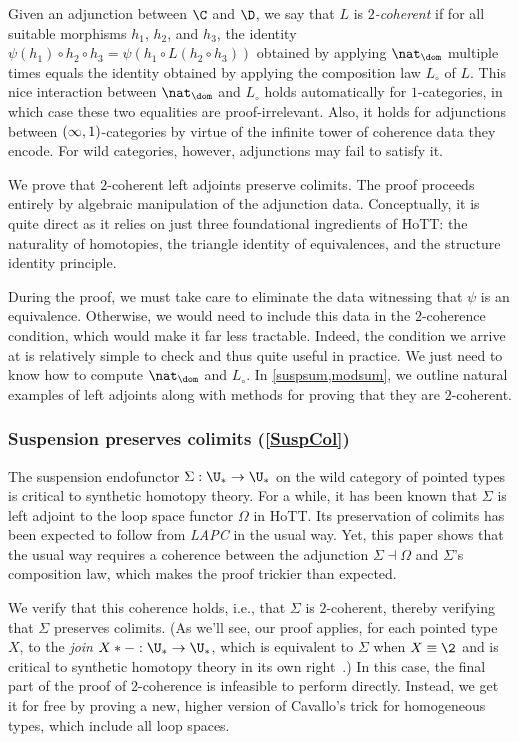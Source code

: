 \documentclass{lmcs}
\theoremstyle{definition}\newtheorem{note}[thm]{Note}
\begin{document}
Given an adjunction between $\C$ and $\D$, we say that $L$ is \emph{$2$-coherent} if for all suitable morphisms $h_1$, $h_2$, and $h_3$, the identity $\psi(h_1) \circ h_2 \circ h_3 = \psi(h_1 \circ L(h_2 \circ h_3))$ obtained by applying $\nat_{\dom}$ multiple times equals the identity obtained by applying the composition law $L_{\circ}$ of $L$. 
This nice interaction between $\nat_{\dom}$ and $L_{\circ}$ holds automatically for $1$-categories, in which case these two equalities are proof-irrelevant. Also, it holds for adjunctions between $\mleft(\infty,1\mright)$-categories by virtue of the infinite tower of coherence data they encode. For wild categories, however, adjunctions may fail to satisfy it.

We prove that $2$-coherent left adjoints preserve colimits. The proof proceeds entirely by algebraic manipulation of the adjunction data. Conceptually, it is quite direct as it relies on just three foundational ingredients of HoTT: the naturality of homotopies, the triangle identity of equivalences, and the structure identity principle. 

During the proof, we must take care to eliminate the data witnessing that $\psi$ is an equivalence. Otherwise, we would need to include this data in the $2$-coherence condition, which would make it far less tractable. Indeed, the condition we arrive at is relatively simple to check and thus quite useful in practice. We just need to know how to compute $\nat_{\dom}$ and $L_{\circ}$. In \cref{suspsum,modsum}, we outline natural examples of left adjoints along with methods for proving that they are $2$-coherent.

\subsubsection{Suspension preserves colimits (\autoref{SuspCol})} \label{suspsum}

The suspension endofunctor $\Sigma : \U_{\ast} \to \U_{\ast}$ on the wild category of pointed types is  critical to synthetic homotopy theory. For a while, it has been known that $\Sigma$ is left adjoint to the loop space functor $\Omega$ in HoTT. Its preservation of colimits has been expected to follow from \emph{LAPC} in the usual way. Yet, this paper shows that the usual way requires a  coherence between the adjunction $\Sigma \dashv \Omega$ and $\Sigma$'s composition law, which makes the proof trickier than expected. 

We verify that this coherence holds, i.e., that $\Sigma$ is $2$-coherent, thereby verifying that $\Sigma$ preserves colimits. (As we'll see, our proof applies, for each pointed type $X$, to the \emph{join} $X \ast {-} : \U_{\ast} \to \U_{\ast}$, which is equivalent to $\Sigma$ when $X \equiv \2$ and is critical to synthetic homotopy theory in its own right~\cite{brunthesis,rijkejoin}.) In this case, the final part of the proof of $2$-coherence is infeasible to perform  directly. Instead, we get it for free by proving a new, higher version of Cavallo's trick for homogeneous types, which include all loop spaces. 
\end{document}
